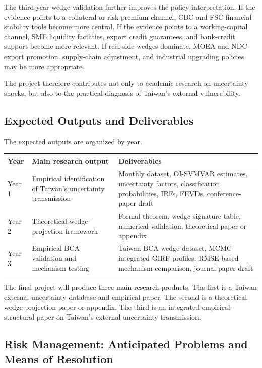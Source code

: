 \documentclass[12pt]{article}
\begin{document}
The third-year wedge validation further improves the policy interpretation. If the evidence points
to a collateral or risk-premium channel, CBC and FSC financial-stability tools become more
central. If the evidence points to a working-capital channel, SME liquidity facilities, export credit
guarantees, and bank-credit support become more relevant. If real-side wedges dominate, MOEA
and NDC export promotion, supply-chain adjustment, and industrial upgrading policies may be
more appropriate.

The project therefore contributes not only to academic research on uncertainty shocks, but also
to the practical diagnosis of Taiwan's external vulnerability.

\subsection{Expected Outputs and Deliverables}

The expected outputs are organized by year.

\begin{center}
\begin{tabular}{p{}p{}p{}}
\toprule
Year & Main research output & Deliverables \\
\midrule
Year 1 &
Empirical identification of Taiwan's uncertainty transmission &
Monthly dataset, OI-SVMVAR estimates, uncertainty factors, classification
probabilities, IRFs, FEVDs, conference-paper draft \\
\addlinespace
Year 2 &
Theoretical wedge-projection framework &
Formal theorem, wedge-signature table, numerical validation, theoretical paper
or appendix \\
\addlinespace
Year 3 &
Empirical BCA validation and mechanism testing &
Taiwan BCA wedge dataset, MCMC-integrated GIRF profiles, RMSE-based mechanism
comparison, journal-paper draft \\
\bottomrule
\end{tabular}
\end{center}

The final project will produce three main research products. The first is a Taiwan external
uncertainty database and empirical paper. The second is a theoretical wedge-projection paper or
appendix. The third is an integrated empirical-structural paper on Taiwan's external uncertainty
transmission.

\subsection{Risk Management: Anticipated Problems and Means of Resolution}
\end{document}
